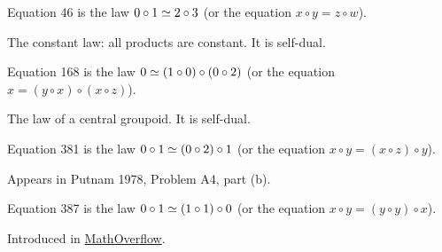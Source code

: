 \begin{definition}[Equation 46]\label{eq46}\leanok{}  Equation 46 is the law $0 \circ 1  \simeq  2 \circ 3$ (or the equation $x \circ y = z \circ w$).
\end{definition}

The constant law: all products are constant. It is self-dual.

\begin{definition}[Equation 168]\label{eq168}\leanok{}  Equation 168 is the law $0  \simeq  (1 \circ 0) \circ (0 \circ 2)$ (or the equation $x = (y \circ x) \circ (x \circ z)$).
\end{definition}

The law of a central groupoid. It is self-dual.

\begin{definition}[Equation 381]\label{eq381}\leanok{}  Equation 381 is the law $0 \circ 1  \simeq  (0 \circ 2) \circ 1$ (or the equation $x \circ y = (x \circ z) \circ y$).
\end{definition}

Appears in Putnam 1978, Problem A4, part (b).

\begin{definition}[Equation 387]\label{eq387}\leanok{}  Equation 387 is the law $0 \circ 1  \simeq  (1 \circ 1) \circ 0$ (or the equation $x \circ y = (y \circ y) \circ x$).
\end{definition}

Introduced in \href{https://mathoverflow.net/a/450905/766}{MathOverflow}.

